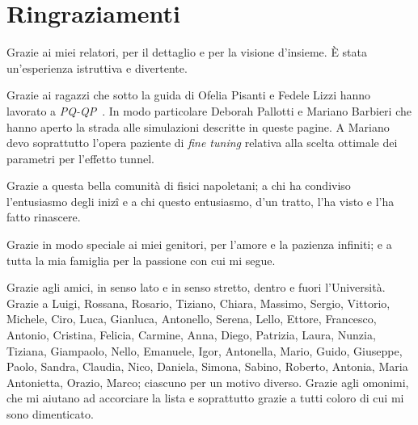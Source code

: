 \chapter*{Ringraziamenti} \label{ringraziamenti}

Grazie ai miei relatori, per il dettaglio e per
la visione d'insieme. \`{E} stata un'esperienza istruttiva e divertente.

Grazie ai ragazzi che sotto la guida di Ofelia Pisanti
e Fedele Lizzi hanno lavorato a 
\emph{PQ-QP}~\cite{PQ-QP}. In modo particolare Deborah Pallotti e
Mariano Barbieri che hanno aperto la strada alle simulazioni descritte
in queste pagine. A Mariano devo soprattutto l'opera paziente 
di \emph{fine tuning} relativa alla scelta ottimale dei parametri per 
l'effetto tunnel. 

Grazie a questa bella comunità di fisici napoletani; a chi ha condiviso 
l’entusiasmo degli iniz\^{i} e a chi questo entusiasmo, d'un tratto, 
l'ha visto e l'ha fatto rinascere.

Grazie in modo speciale ai miei genitori, per l'amore e 
la pazienza infiniti; e a tutta
la mia famiglia per la passione con cui mi segue.

Grazie agli amici, in senso lato e in senso stretto, dentro e fuori 
l'Università. Grazie a Luigi, Rossana, Rosario, Tiziano, 
Chiara, Massimo, Sergio, Vittorio, Michele, Ciro, Luca, Gianluca, 
Antonello, Serena, Lello, Ettore, Francesco, Antonio, Cristina, 
Felicia, Carmine, Anna, Diego, Patrizia, Laura, Nunzia, Tiziana, 
Giampaolo, Nello, Emanuele, Igor,
Antonella, Mario, Guido, Giuseppe, Paolo, Sandra, Claudia, Nico, 
Daniela, Simona, Sabino, Roberto, Antonia, Maria Antonietta, Orazio, Marco; 
ciascuno per un motivo diverso. Grazie agli omonimi, che mi aiutano
ad accorciare la lista e soprattutto grazie a tutti coloro di cui
mi sono dimenticato.

%


